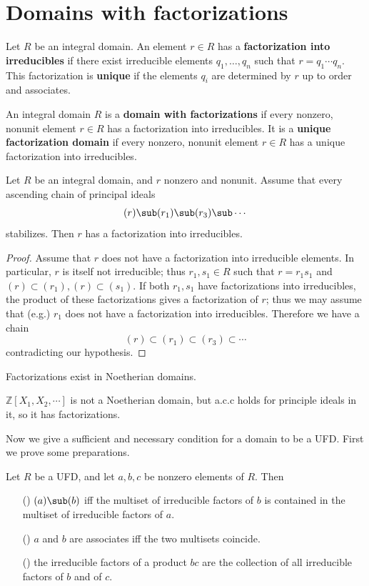 \section{Domains with factorizations}
\begin{definition}
Let $R$ be an integral domain. An element $r\in R$ has a \textbf{factorization into irreducibles} if there exist irreducible elements $q_1,\dots,q_n$ such that $r=q_1\cdots q_n$. This factorization is \textbf{unique} if the elements $q_i$ are determined by $r$ up to order and associates.
\end{definition}
\begin{definition}
An integral domain $R$ is a \textbf{domain with factorizations} if every nonzero, nonunit element $r\in R$ has a factorization into irreducibles. It is a \textbf{unique factorization domain} if every nonzero, nonunit element $r\in R$ has a unique factorization into irreducibles.
\end{definition}
\begin{proposition}\label{integral domain factorization if}
Let $R$ be an integral domain, and $r$ nonzero and nonunit. Assume that every ascending chain of principal ideals
\[(r)\sub(r_1)\sub(r_3)\sub\cdots\]
stabilizes. Then $r$ has a factorization into irreducibles.
\end{proposition}
\begin{proof}
Assume that $r$ does not have a factorization into irreducible elements. In particular, $r$ is itself not irreducible; thus $r_1,s_1\in R$ such that $r=r_1s_1$ and $(r)\subset (r_1),(r)\subset(s_1)$. If both $r_1,s_1$ have factorizations into irreducibles, the product of these factorizations gives a factorization of $r$; thus we may assume that (e.g.) $r_1$ does not have a factorization into irreducibles. Therefore we have a chain
\[(r)\subset (r_1)\subset(r_3)\subset\cdots\]
contradicting our hypothesis.
\end{proof}
\begin{corollary}
Factorizations exist in Noetherian domains.
\end{corollary}
\begin{example}
$\mathbb{Z}[X_1,X_2,\cdots]$ is not a Noetherian domain, but a.c.c holds for principle ideals in it, so it has factorizations.
\end{example}
Now we give a sufficient and necessary condition for a domain to be a UFD. First we prove some preparations.
\begin{lemma}\label{UFD multiset of factors prop}
Let $R$ be a UFD, and let $a,b,c$ be nonzero elements of $R$. Then
\begin{itemize}
\item[(\rmnum{1})] $(a)\sub(b)$ iff the multiset of irreducible factors of $b$ is contained in the multiset of irreducible factors of $a$.
\item[(\rmnum{2})] $a$ and $b$ are associates iff the two multisets coincide.
\item[(\rmnum{3})] the irreducible factors of a product $bc$ are the collection of all irreducible factors of $b$ and of $c$.
\end{itemize}
\end{lemma}
